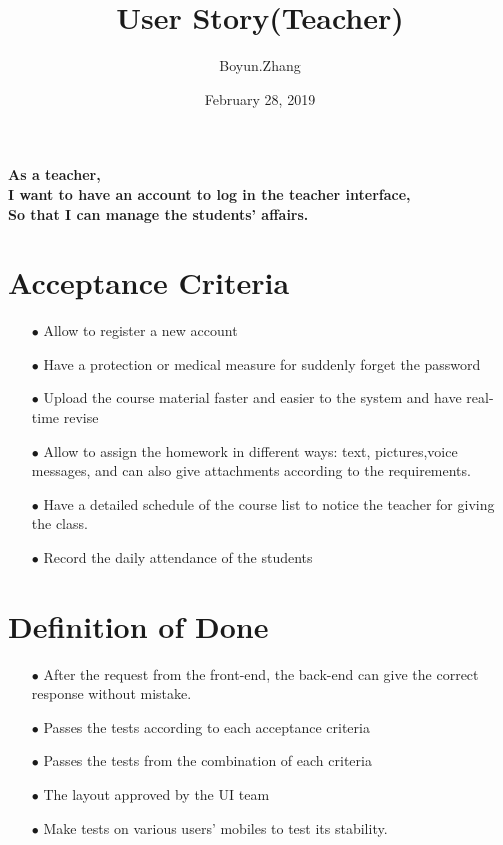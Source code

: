 \documentclass{article}
\begin{document}
\title{User Story(Teacher)}
\author{Boyun.Zhang}
\date{February 28, 2019}
\maketitle
\paragraph{\large As a teacher, \\
I want to have an account to log in the teacher interface,\\
So that I can manage the students' affairs.}
\section*{Acceptance Criteria}
\begin{itemize}
\item[$\bullet$] Allow to register a new account
\item[$\bullet$] Have a protection or medical measure for suddenly forget the password
\item[$\bullet$] Upload the course material faster and easier to the system and have real-time revise 
\item[$\bullet$] Allow to assign the homework in different ways: text, pictures,voice messages, and can also give attachments according to the requirements.
\item[$\bullet$] Have a detailed schedule of the course list to notice the teacher for giving the class.
\item[$\bullet$] Record the daily attendance of the students
\end{itemize}

\section*{Definition of Done}
\begin{itemize}
\item[$\bullet$] After the request from the front-end, the back-end can give the correct response without mistake.
\item[$\bullet$] Passes the tests according to each acceptance criteria
\item[$\bullet$] Passes the tests from the combination of each criteria
\item[$\bullet$] The layout approved by the UI team
\item[$\bullet$] Make tests on various users' mobiles to test its stability.
\end{itemize}
\end{document}
